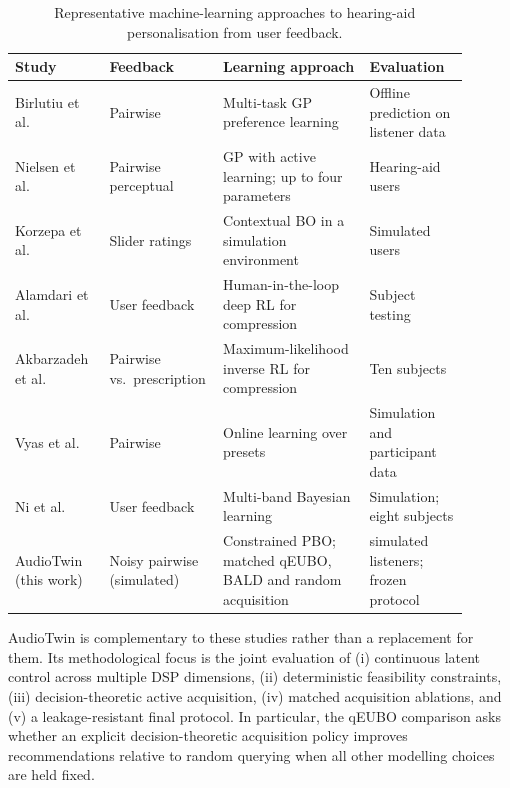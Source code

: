 \documentclass[preprint,12pt]{elsarticle}
\begin{document}
\begin{table}[!htbp]
\centering
\caption{Representative machine-learning approaches to hearing-aid personalisation from user feedback.}
\label{tab:prior}
\small
\begin{tabular}{@{}>{\raggedright\arraybackslash}p{0.205\linewidth}>{\raggedright\arraybackslash}p{0.18\linewidth}>{\raggedright\arraybackslash}p{0.31\linewidth}>{\raggedright\arraybackslash}p{0.21\linewidth}@{}}
\toprule
Study & Feedback & Learning approach & Evaluation \\
\midrule
Birlutiu et al.~\cite{birlutiu2010} & Pairwise & Multi-task GP preference learning & Offline prediction on listener data \\
Nielsen et al.~\cite{nielsen2015} & Pairwise perceptual & GP with active learning; up to four parameters & Hearing-aid users \\
Korzepa et al.~\cite{korzepa2020} & Slider ratings & Contextual BO in a simulation environment & Simulated users \\
Alamdari et al.~\cite{alamdari2020} & User feedback & Human-in-the-loop deep RL for compression & Subject testing \\
Akbarzadeh et al.~\cite{akbarzadeh2022} & Pairwise vs.\ prescription & Maximum-likelihood inverse RL for compression & Ten subjects \\
Vyas et al.~\cite{vyas2022} & Pairwise & Online learning over presets & Simulation and participant data \\
Ni et al.~\cite{ni2024} & User feedback & Multi-band Bayesian learning & Simulation; eight subjects \\
AudioTwin (this work) & Noisy pairwise (simulated) & Constrained PBO; matched qEUBO, BALD and random acquisition & 128 simulated listeners; frozen protocol \\
\bottomrule
\end{tabular}
\end{table}

AudioTwin is complementary to these studies rather than a replacement for them. Its methodological focus is the joint evaluation of (i) continuous latent control across multiple DSP dimensions, (ii) deterministic feasibility constraints, (iii) decision-theoretic active acquisition, (iv) matched acquisition ablations, and (v) a leakage-resistant final protocol. In particular, the qEUBO comparison asks whether an explicit decision-theoretic acquisition policy improves recommendations relative to random querying when all other modelling choices are held fixed.
\end{document}

